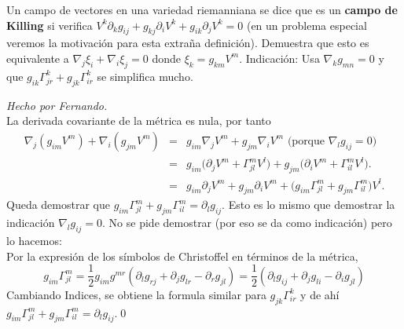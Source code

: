 \begin{problem}[10] Un campo de vectores en una variedad riemanniana se dice que es un \textbf{campo de Killing} si verifica $V^k\partial_k g_{ij}+g_{kj}\partial_i V^k+ g_{ik}\partial_jV^k=0$ (en un problema especial veremos la motivación para esta extraña definición). 
	Demuestra que esto es equivalente a  
	$\nabla_j \xi_i+\nabla_i \xi_j=0$ donde $\xi_k=g_{km}V^m$.
	Indicación:  
	Usa $\nabla_k g_{mn}=0$ y que
	$g_{ik}\Gamma_{jr}^k+g_{jk}\Gamma_{ir}^k$ se simplifica mucho. 
	
	\solution\textit{Hecho por Fernando.}\\ La derivada covariante de la métrica es nula, por tanto
	\begin{eqnarray*}
		\nabla_j(g_{im}V^m)
		+
		\nabla_i(g_{jm}V^m)
		&=&
		g_{im}\nabla_j V^m 
		+
		g_{jm}\nabla_i V^m \text{ (porque }\nabla_lg_{ij}=0 )
		\\
		&=&
		g_{im}\big( \partial_j V^m+ \Gamma_{jl}^mV^l) 
		+
		g_{jm}\big( \partial_i V^m+ \Gamma_{il}^mV^l).
		\\
		&=&
		g_{im}\partial_j V^m+g_{jm} \partial_i V^m  
		+\big( g_{im}\Gamma_{jl}^m  + g_{jm}\Gamma_{il}^m)V^l.
	\end{eqnarray*}
	Queda demostrar que $g_{im}\Gamma^m_{jl}+g_{jm}\Gamma^m_{il}=\partial_lg_{ij}$. Esto es lo mismo que demostrar la indicación $\nabla_lg_{ij}=0$. No se pide demostrar (por eso se da como indicación) pero lo hacemos:\\
	Por la expresión de los símbolos de Christoffel en términos de la métrica,
	\[
	g_{im}\Gamma_{jl}^m
	=
	\frac{1}{2}g_{im}g^{mr}
	(\partial_l g_{rj}+\partial_j g_{lr}-\partial_r g_{jl})
	=
	\frac{1}{2}
	(\partial_l g_{ij}+\partial_j g_{li}-\partial_i g_{jl})
	\]
	Cambiando Indices, se obtiene la formula similar para 
	$g_{jk}\Gamma_{ir}^k$ y de ahí $g_{im}\Gamma_{jl}^m  + g_{jm}\Gamma_{il}^m=\partial_l g_{ij}$.\qed
	
	
\end{problem}